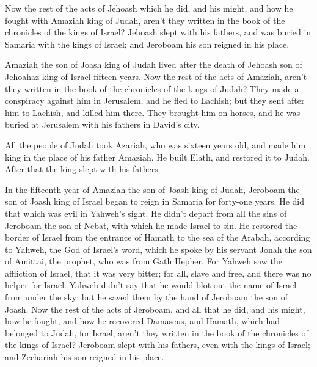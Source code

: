 {\par }{\PP {}Now the rest of the acts of Jehoash which he did, and his might, and how he fought with Amaziah king of Judah, aren’t they written in the book of the chronicles of the kings of Israel?
Jehoash slept with his fathers, and was buried in Samaria with the kings of Israel; and Jeroboam his son reigned in his place.
\par }{\PP {}Amaziah the son of Joash king of Judah lived after the death of Jehoash son of Jehoahaz king of Israel fifteen years.
Now the rest of the acts of Amaziah, aren’t they written in the book of the chronicles of the kings of Judah?
They made a conspiracy against him in Jerusalem, and he fled to Lachish; but they sent after him to Lachish, and killed him there.
They brought him on horses, and he was buried at Jerusalem with his fathers in David’s city.
\par }{\PP {}All the people of Judah took Azariah, who was sixteen years old, and made him king in the place of his father Amaziah.
He built Elath, and restored it to Judah. After that the king slept with his fathers.
\par }{\PP {}In the fifteenth year of Amaziah the son of Joash king of Judah, Jeroboam the son of Joash king of Israel began to reign in Samaria for forty-one years.
He did that which was evil in Yahweh’s sight. He didn’t depart from all the sins of Jeroboam the son of Nebat, with which he made Israel to sin.
He restored the border of Israel from the entrance of Hamath to the sea of the Arabah, according to Yahweh, the God of Israel’s word, which he spoke by his servant Jonah the son of Amittai, the prophet, who was from Gath Hepher.
For Yahweh saw the affliction of Israel, that it was very bitter; for all, slave and free, and there was no helper for Israel.
Yahweh didn’t say that he would blot out the name of Israel from under the sky; but he saved them by the hand of Jeroboam the son of Joash.
Now the rest of the acts of Jeroboam, and all that he did, and his might, how he fought, and how he recovered Damascus, and Hamath, which had belonged to Judah, for Israel, aren’t they written in the book of the chronicles of the kings of Israel?
Jeroboam slept with his fathers, even with the kings of Israel; and Zechariah his son reigned in his place.

}
